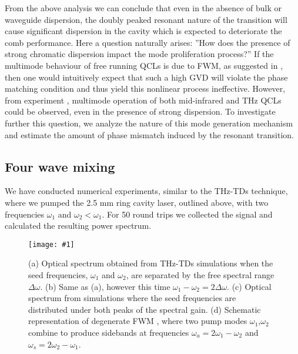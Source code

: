 \documentclass[10pt]{article}
\newcommand{\includegraphicsXL}[1]{\texttt{[image: \#1]}}
\begin{document}
	From the above analysis we can conclude that even in the absence of bulk or
	waveguide dispersion, the doubly peaked resonant nature of the transition will
	cause significant dispersion in the cavity which is expected to deteriorate
	the comb performance. Here a question naturally arises: ''How does the
	presence of strong chromatic dispersion impact the mode proliferation
	process?'' If the multimode behaviour of free running QCLs is due to FWM, as
	suggested in \cite{friedli2013four,khurgin2014coherent}, then one would
	intuitively expect that such a high GVD will violate the phase matching
	condition and thus yield this nonlinear process ineffective. However, from
	experiment \cite{burghoff2014terahertz,rosch2015octave}, multimode operation
	of both mid-infrared and THz QCLs could be observed, even in the presence of
	strong dispersion. To investigate further this question, we analyze the
	nature of this mode generation mechanism and estimate the amount of phase
	mismatch induced by the resonant transition.
	
	\subsection{Four wave mixing}
		
	We have conducted numerical experiments, similar to the THz-TDs technique,
	where we pumped the 2.5 mm ring cavity laser, outlined above, with two frequencies
	$\omega_{1}$ and $\omega_{2}<\omega_{1}$. For 50 round trips we collected the
	signal and calculated the resulting power spectrum.

	\label{subsec:FWM}
	\begin{figure}[h!]
		\begin{center}
			\includegraphicsXL{FWM.eps}
		\end{center}
		\caption{(a) Optical spectrum
			obtained from THz-TDs simulations when the seed frequencies, $\omega_{1}$ and
			$\omega_{2}$, are separated by the free spectral range $\Delta\omega$.
			(b) Same as (a), however this time $\omega_{1}-\omega
			_{2}=2\Delta\omega$. (c) Optical spectrum from simulations where the
			seed frequencies are distributed under both peaks of the spectral gain.
			(d) Schematic representation of degenerate FWM
			\cite{butcher1991elements}, where two pump modes $\omega_{1}$,$\omega_{2}$
			combine to produce sidebands at frequencies $\omega_{a}=2\omega_{1}-\omega
			_{2}$ and $\omega_{s}=2\omega_{2}-\omega_{1}$.}%
		\label{fig:img04}%
	\end{figure}
	
\end{document}
